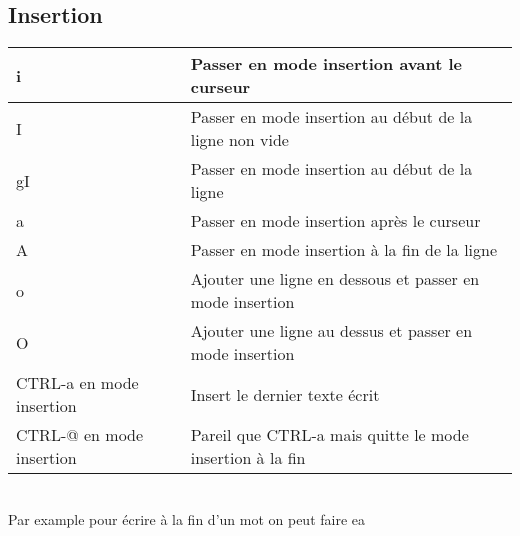 \documentclass{article}
\begin{document}
                            \subsection{Insertion}
                            \begin{tabular}{|p{3cm}| l| }
                                \hline
                                i & Passer en mode insertion avant le curseur\\ \hline
                                I & Passer en mode insertion au début de la ligne non vide\\ \hline
                                gI & Passer en mode insertion au début de la ligne\\ \hline
                                a & Passer en mode insertion après le curseur\\ \hline
                                A & Passer en mode insertion à la fin de la ligne\\ \hline
                                o & Ajouter une ligne en dessous et passer en mode insertion \\ \hline
                                O & Ajouter une ligne au dessus et passer en mode insertion \\ \hline
                                CTRL-a en mode insertion & Insert le dernier texte écrit  \\ \hline
                                CTRL-@ en mode insertion & Pareil que CTRL-a mais quitte le mode insertion à la fin  \\ \hline
                            \end{tabular}\\

                            Par example pour écrire à la fin d'un mot on peut faire ea
\end{document}
